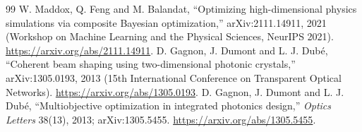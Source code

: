 \begin{thebibliography}{99}
 W. Maddox, Q. Feng and M. Balandat, ``Optimizing high-dimensional physics simulations via composite Bayesian optimization,'' arXiv:2111.14911, 2021 (Workshop on Machine Learning and the Physical Sciences, NeurIPS 2021). \url{https://arxiv.org/abs/2111.14911}.
 D. Gagnon, J. Dumont and L. J. Dub\'e, ``Coherent beam shaping using two-dimensional photonic crystals,'' arXiv:1305.0193, 2013 (15th International Conference on Transparent Optical Networks). \url{https://arxiv.org/abs/1305.0193}.
 D. Gagnon, J. Dumont and L. J. Dub\'e, ``Multiobjective optimization in integrated photonics design,'' \emph{Optics Letters} 38(13), 2013; arXiv:1305.5455. \url{https://arxiv.org/abs/1305.5455}.
\end{thebibliography}
